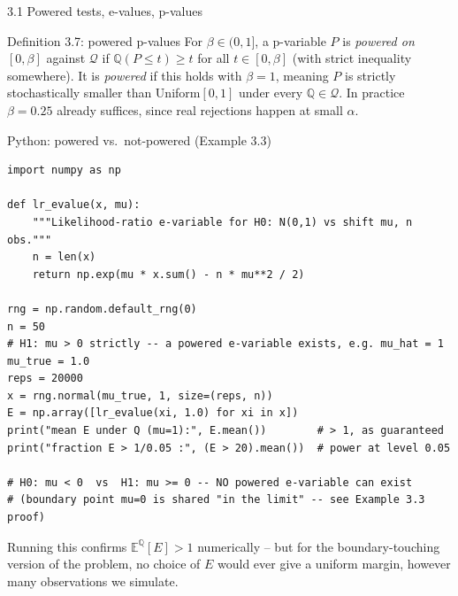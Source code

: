 \documentclass[aspectratio=169,10pt]{beamer}
\newcommand{\QQ}{\mathbb{Q}}
\newcommand{\EE}{\mathbb{E}}
\newcommand{\calQ}{\mathcal{Q}}
\begin{document}
\begin{frame}[allowframebreaks]{3.1 Powered tests, e-values, p-values}
  \begin{block}{Definition 3.7: powered p-values}
    For $\beta\in(0,1]$, a p-variable $P$ is \emph{powered on $[0,\beta]$} against $\calQ$ if $\QQ(P\le t)\ge t$ for all $t\in[0,\beta]$ (with strict inequality somewhere). It is \emph{powered} if this holds with $\beta=1$, meaning $P$ is strictly stochastically smaller than Uniform$[0,1]$ under every $\QQ\in\calQ$. In practice $\beta=0.25$ already suffices, since real rejections happen at small $\alpha$.
  \end{block}
\end{frame}

\begin{frame}[fragile]{Python: powered vs.\ not-powered (Example 3.3)}
  \begin{lstlisting}
import numpy as np

def lr_evalue(x, mu):
    """Likelihood-ratio e-variable for H0: N(0,1) vs shift mu, n obs."""
    n = len(x)
    return np.exp(mu * x.sum() - n * mu**2 / 2)

rng = np.random.default_rng(0)
n = 50
# H1: mu > 0 strictly -- a powered e-variable exists, e.g. mu_hat = 1
mu_true = 1.0
reps = 20000
x = rng.normal(mu_true, 1, size=(reps, n))
E = np.array([lr_evalue(xi, 1.0) for xi in x])
print("mean E under Q (mu=1):", E.mean())        # > 1, as guaranteed
print("fraction E > 1/0.05 :", (E > 20).mean())  # power at level 0.05

# H0: mu < 0  vs  H1: mu >= 0 -- NO powered e-variable can exist
# (boundary point mu=0 is shared "in the limit" -- see Example 3.3 proof)
  \end{lstlisting}
  Running this confirms $\EE^\QQ[E]>1$ numerically -- but for the boundary-touching version of the problem, no choice of $E$ would ever give a uniform margin, however many observations we simulate.
\end{frame}
\end{document}
